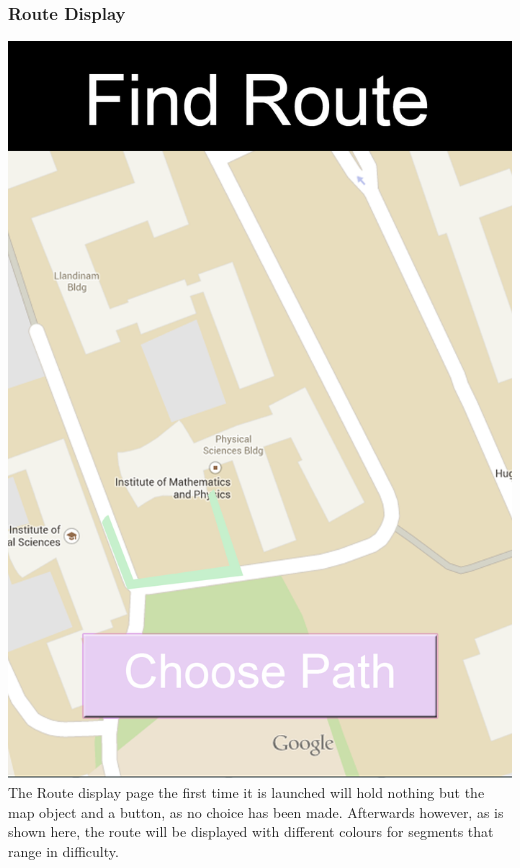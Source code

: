 \documentclass[10pt,a4paper]{article}
\begin{document}
\subsubsection{Route Display}
\includegraphics[scale=0.6]{Route.png}\\
The Route display page the first time it is launched will hold nothing but the map object and a button, as no choice has been made. Afterwards however, as is shown here, the route will be displayed with different colours for segments that range in difficulty.
\end{document}
